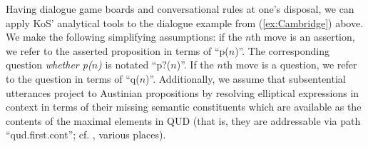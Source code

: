 \documentclass[output=paper]{langsci/langscibook}
\begin{document}
{Having dialogue game boards and conversational rules at one's disposal, we can apply KoS' analytical tools to the dialogue example from (\ref{ex:Cambridge}) above.
%
We make the following simplifying assumptions: if the $n$th move is an assertion, we refer to the asserted proposition in terms of \enquote{p($n$)}. %
The corresponding question \textit{whether p($n$)} is notated \enquote{p?($n$)}.
%
If the $n$th move is a question, we refer to the question in terms of \enquote{q($n$)}.
%
Additionally, we assume that subsentential utterances project to Austinian propositions by resolving elliptical expressions in context in terms of their missing semantic constituents which are available as the contents of the maximal elements in QUD (that is, they are addressable via path \enquote{qud.first.cont}; cf.  \textcite{Ginzburg:2012}, various places). 

}
\end{document}
